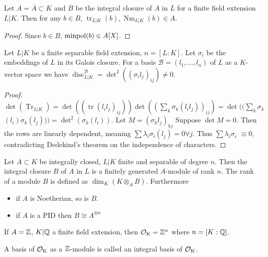 \documentclass[12pt, a4paper]{article}
\DeclareMathOperator{\tr}{tr}
\DeclareMathOperator{\Tr}{Tr}
\DeclareMathOperator{\Nm}{Nm}
\DeclareMathOperator{\disc}{disc}
\begin{document}
	\begin{prop}{}{}
		Let $A = \overline{A} \subset K$ and $B$ be the integral closure of 
		$A$ in $L$ for a finite field extension $L\vert K$. Then for 
		any $b \in B$, $\tr_{L \vert K}(b), \Nm_{L \vert K}(b) \in A$. 
	\end{prop}

	\begin{proof}
		Since $b \in B$, $\operatorname{minpol}(b) \in A[X]$.
	\end{proof}

	\begin{prop}{}{}
		Let $L\vert K$ be a finite separable field extension, $n = [L:K]$. 
		Let $\sigma_i$ be the embeddings of $L$ in its Galois closure. 
		For a basis $\mathcal{B} = (l_1, \dots, l_n)$ of $L$ as a 
		$K$-vector space we have $\disc_{L \vert K}^{\mathcal{B}} = 
		\det^2((\sigma_i l_j)_{ij}) \neq 0$.
	\end{prop}

	\begin{proof}
		$\det(\Tr_{L\vert K}) = \det((\tr(l_il_j)_{ij})) \det((\sum_{k}
	\sigma_k(l_il_j))_{ij}) = \det((\sum_{k}\sigma_k$ $(l_i) \sigma_k(l_j))) = 
	\det^2(\sigma_k(l_i)) $. Let $M = (\sigma_kl_j)_{kj}$
	Suppose $\det M = 0$. Then the rows are linearly dependent, meaning
	$\sum \lambda_i \sigma_i(l_j) = 0 \forall  j$. Thus $\sum \lambda_i \sigma_i$
	$\equiv 0$, contradicting Dedekind's theorem on the independence of 
	characters.
	\end{proof}

	\begin{thm}{}{}
		Let $A \subset K$ be integrally closed, $L \vert K$ finite and separable
		of degree $n$. Then the integral closure $B$ of $A$ in $L$ is a 
		finitely generated $A$-module of rank $n$. The rank of a module $B$
		is defined as $\dim_K(K \otimes_A B)$. Furthermore
		\begin{itemize}
			\item if $A$ is Noetherian, so is $B$.
			\item if $A$ is a PID then $B \cong A^{\oplus n}$
		\end{itemize}
	\end{thm}

	\begin{cor}{}{}
		If $A = \mathbb{Z}$, $K \vert \mathbb{Q}$ a finite field extension, then 
		$\operatorname{\mathcal{O}_K} = \mathbb{Z}^n$ where $n = [K : \mathbb{Q}]$.
	\end{cor}


	\begin{Def}{}{}
		A basis of $\operatorname{\mathcal{O}_K}$ as a $\mathbb{Z}$-module  is called an integral basis 
		of $\operatorname{\mathcal{O}_K}$.
	\end{Def}
\end{document}
